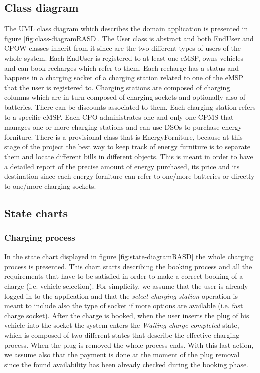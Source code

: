 \documentclass[a4paper]{report}
\begin{document}
\subsection{Class diagram}
The UML class diagram which describes the domain application is presented in figure \ref{fig:class-diagramRASD}. The User class is abstract and both EndUser and CPOW classes inherit from it since are the two different types of users of the whole system. Each EndUser is registered to at least one eMSP, owns vehicles and can book recharges which refer to them. Each recharge has a status and happens in a charging socket of a charging station related to one of the eMSP that the user is registered to. Charging stations are composed of charging columns which are in turn composed of charging sockets and optionally also of batteries. There can be discounts associated to them. Each charging station refers to a specific eMSP. Each CPO administrates one and only one CPMS that manages one or more charging stations and can use DSOs to purchase energy forniture. There is a provisional class that is EnergyForniture, because at this stage of the project the best way to keep track of energy furniture is to separate them and locate different bills in different objects. This is meant in order to have a detailed report of the precise amount of energy purchased, its price and its destination since each energy forniture can refer to one/more batteries or directly to one/more charging sockets.

\subsection{State charts}
\subsubsection{Charging process}
In the state chart displayed in figure \ref{fig:state-diagramRASD} the whole charging process is presented. This chart starts describing the booking process and all the requirements that have to be satisfied in order to make a correct booking of a charge (i.e. vehicle selection).  For simplicity, we assume that the user is already logged in to the application and that the \textit{select charging station} operation is meant to include also the type of socket if more options are available (i.e. fast charge socket). After the charge is booked, when the user inserts the plug of his vehicle into the socket the system enters the \textit{Waiting charge completed} state, which is composed of two different states that describe the effective charging process. When the plug is removed the whole process ends. With this last action, we assume also that the payment is done at the moment of the plug removal since the found availability has been already checked during the booking phase.
\end{document}
